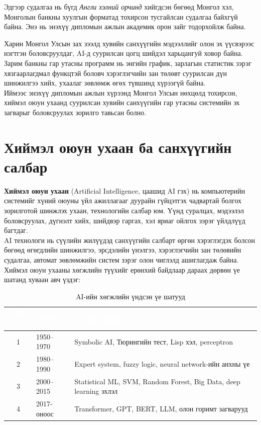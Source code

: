 Эдгээр судалгаа нь бүгд \emph{Англи хэлний орчинд} хийгдсэн бөгөөд Монгол хэл, Монголын банкны хуулгын форматад тохирсон тусгайлсан судалгаа байхгүй байна. Энэ нь энэхүү дипломын ажлын академик орон зайг тодорхойлж байна.

Харин Монгол Улсын зах зээлд хувийн санхүүгийн мэдээллийг олон эх үүсвэрээс нэгтгэн боловсруулдаг, AI-д суурилсан цогц шийдэл харьцангуй ховор байна. Зарим банкны гар утасны программ нь энгийн график, зарлагын статистик зэрэг хязгаарлагдмал функцтэй боловч хэрэглэгчийн зан төлөвт суурилсан дүн шинжилгээ хийх, ухаалаг зөвлөмж өгөх түвшинд хүрээгүй байна.\\

Иймээс энэхүү дипломын ажлын хүрээнд Монгол Улсын нөхцөлд тохирсон, хиймэл оюун ухаанд суурилсан хувийн санхүүгийн гар утасны системийн эх загварыг боловсруулах зорилго тавьсан болно.

\section{Хиймэл оюун ухаан ба санхүүгийн салбар}
\textbf{Хиймэл оюун ухаан} (Artificial Intelligence, цаашид AI гэх) нь компьютерийн системийг хүний оюуны үйл ажиллагааг дуурайн гүйцэтгэх чадвартай болгох зорилготой шинжлэх ухаан, технологийн салбар юм. Үүнд суралцах, мэдээлэл боловсруулах, дүгнэлт хийх, шийдвэр гаргах, хэл яриаг ойлгох зэрэг үйлдлүүд багтдаг.\\

AI технологи нь сүүлийн жилүүдэд санхүүгийн салбарт өргөн хэрэглэгдэх болсон бөгөөд өгөгдлийн шинжилгээ, эрсдэлийн үнэлгээ, хэрэглэгчийн зан төлөвийн судалгаа, автомат зөвлөмжийн систем зэрэг олон чиглэлд ашиглагдаж байна.\\

Хиймэл оюун ухааны хөгжлийн түүхийг ерөнхий байдлаар дараах дөрвөн үе шатанд хуваан авч үздэг:

\begin{table}[ht]
\centering
\footnotesize
\renewcommand{\arraystretch}{1.2}
\begin{tabular}{|c|p{3cm}|p{7.5cm}|}
\hline
\rowcolor{darknavy}
\textcolor{white}{\textbf{Үе шат}} & \textcolor{white}{\textbf{Огноо}} & \textcolor{white}{\textbf{Гол үйл явдлууд}} \\ \hline
1 & 1950--1970   & Symbolic AI, Тюрингийн тест, Lisp хэл, perceptron \\ \hline
2 & 1980--1990   & Expert system, fuzzy logic, neural network-ийн анхны үе \\ \hline
3 & 2000--2015   & Statistical ML, SVM, Random Forest, Big Data, deep learning эхлэл \\ \hline
4 & 2017-оноос   & Transformer, GPT, BERT, LLM, олон горимт загварууд \\ \hline
\end{tabular}
\caption{AI-ийн хөгжлийн үндсэн үе шатууд}
\label{tab:ai-history}
\end{table}

